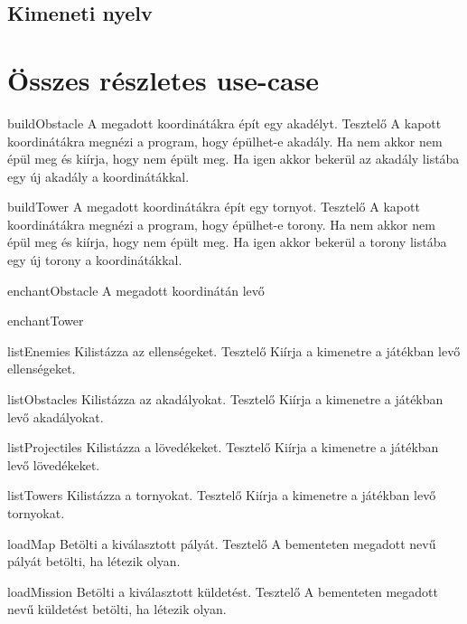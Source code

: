
\subsection{Kimeneti nyelv}

\section{Összes részletes use-case}

\usecase
{buildObstacle}
{A megadott koordinátákra épít egy akadélyt.}
{Tesztelő}
{A kapott koordinátákra megnézi a program, hogy épülhet-e akadály. Ha nem akkor nem épül meg és kiírja, hogy nem épült meg. 
Ha igen akkor bekerül az akadály listába egy új akadály a koordinátákkal.}

\usecase
{buildTower}
{A megadott koordinátákra épít egy tornyot.}
{Tesztelő}
{A kapott koordinátákra megnézi a program, hogy épülhet-e torony. Ha nem akkor nem épül meg és kiírja, hogy nem épült meg. 
Ha igen akkor bekerül a torony listába egy új torony a koordinátákkal.}

\usecase
{enchantObstacle}
{A megadott koordinátán levő }
{}
{}

\usecase
{enchantTower}
{}
{}
{}

\usecase
{listEnemies}
{Kilistázza az ellenségeket.}
{Tesztelő}
{Kiírja a kimenetre a játékban levő ellenségeket.}

\usecase
{listObstacles}
{Kilistázza az akadályokat.}
{Tesztelő}
{Kiírja a kimenetre a játékban levő akadályokat.}

\usecase
{listProjectiles}
{Kilistázza a lövedékeket.}
{Tesztelő}
{Kiírja a kimenetre a játékban levő lövedékeket.}

\usecase
{listTowers}
{Kilistázza a tornyokat.}
{Tesztelő}
{Kiírja a kimenetre a játékban levő tornyokat.}

\usecase
{loadMap}
{Betölti a kiválasztott pályát.}
{Tesztelő}
{A bementeten megadott nevű pályát betölti, ha létezik olyan.}

\usecase
{loadMission}
{Betölti a kiválasztott küldetést.}
{Tesztelő}
{A bementeten megadott nevű küldetést betölti, ha létezik olyan.}

